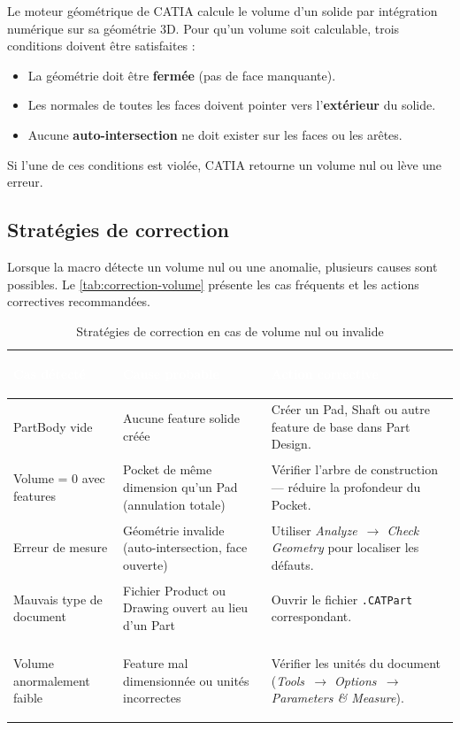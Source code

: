 Le moteur géométrique de CATIA calcule le volume d'un solide par intégration numérique sur sa géométrie 3D. Pour qu'un volume soit calculable, trois conditions doivent être satisfaites :

\begin{itemize}
    \item[•] La géométrie doit être \textbf{fermée} (pas de face manquante).
    \item[•] Les normales de toutes les faces doivent pointer vers l'\textbf{extérieur} du solide.
    \item[•] Aucune \textbf{auto-intersection} ne doit exister sur les faces ou les arêtes.
\end{itemize}

Si l'une de ces conditions est violée, CATIA retourne un volume nul ou lève une erreur.

\subsection{Stratégies de correction}

Lorsque la macro détecte un volume nul ou une anomalie, plusieurs causes sont possibles. Le \autoref{tab:correction-volume} présente les cas fréquents et les actions correctives recommandées.

\begin{table}[H]
    \centering
    \caption{Stratégies de correction en cas de volume nul ou invalide}
    \label{tab:correction-volume}
    \begin{tabularx}{\textwidth}{|>{\bfseries\raggedright\arraybackslash}p{3.2cm}|p{3.8cm}|X|}
        \hline
        \rowcolor{headerblue}
        \textcolor{white}{\textbf{Cas détecté}} & \textcolor{white}{\textbf{Cause probable}} & \centering\textcolor{white}{\textbf{Action corrective}} \tabularnewline
        \hline
        \rowcolor{rowlight}
        PartBody vide & Aucune feature solide créée & Créer un Pad, Shaft ou autre feature de base dans Part Design. \\
        \hline
        \rowcolor{rowwhite}
        Volume = 0 avec features & Pocket de même dimension qu'un Pad (annulation totale) & Vérifier l'arbre de construction --- réduire la profondeur du Pocket. \\
        \hline
        \rowcolor{rowlight}
        Erreur de mesure & Géométrie invalide (auto-intersection, face ouverte) & Utiliser \textit{Analyze~$\rightarrow$ Check Geometry} pour localiser les défauts. \\
        \hline
        \rowcolor{rowwhite}
        Mauvais type de document & Fichier Product ou Drawing ouvert au lieu d'un Part & Ouvrir le fichier \texttt{.CATPart} correspondant. \\
        \hline
        \rowcolor{rowlight}
        Volume anormalement faible & Feature mal dimensionnée ou unités incorrectes & Vérifier les unités du document (\textit{Tools~$\rightarrow$ Options~$\rightarrow$ Parameters \& Measure}). \\
        \hline
    \end{tabularx}
\end{table}

